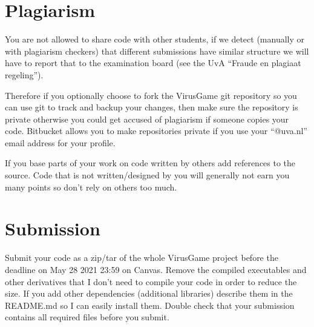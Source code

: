 \documentclass[12pt]{article}
\begin{document}
\section{Plagiarism}
You are not allowed to share code with other students, if we detect
(manually or with plagiarism checkers) that different submissions have
similar structure we will have to report that to the examination
board (see the UvA ``Fraude en plagiaat regeling'').

Therefore if you optionally choose to fork the VirusGame git
repository so you can use git to track and backup your changes, then
make sure the repository is private otherwise you could get accused of
plagiarism if someone copies your code. Bitbucket allows you to make
repositories private if you use your ``@uva.nl'' email address for
your profile.

If you base parts of your work on code written by others add
references to the source. Code that is not written/designed by you
will generally not earn you many points so don't rely on others too
much.

\section{Submission}
Submit your code as a zip/tar of the whole VirusGame project before
the deadline on May 28 2021 23:59 on Canvas. Remove the compiled
executables and other derivatives that I don't need to compile your
code in order to reduce the size. If you add other dependencies
(additional libraries) describe them in the README.md so I can easily
install them. Double check that your submission contains all required
files before you submit.
\end{document}
